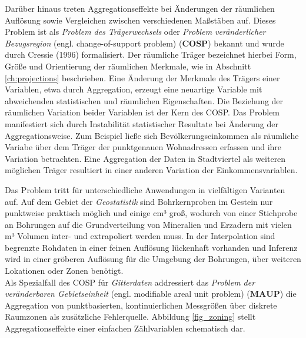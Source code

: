 Darüber hinaus treten Aggregationseffekte bei Änderungen der räumlichen Auflösung sowie Vergleichen zwischen verschiedenen Maßstäben auf.
Dieses Problem ist als \emph{Problem des Trägerwechsels} oder \emph{Problem veränderlicher Bezugsregion} (engl. change-of-support problem) ($\mathbf{COSP}$) bekannt und 
wurde durch Cressie (1996) formalisiert. Der räumliche Träger bezeichnet hierbei Form, Größe und Orientierung der räumlichen Merkmale, wie in Abschnitt \ref{ch:projections} beschrieben. 
Eine Änderung der Merkmale des Trägers einer Variablen, etwa durch Aggregation, erzeugt eine neuartige Variable mit 
abweichenden statistischen und räumlichen Eigenschaften.
Die Beziehung der räumlichen Variation beider Variablen ist der Kern des COSP. \cite[S. 107]{waller_applied_2004}
Das Problem manifestiert sich durch Instabilität statistischer Resultate bei Änderung der Aggregationsweise. 
Zum Beispiel ließe sich Bevölkerungseinkommen als räumliche Variabe über dem Träger der punktgenauen Wohnadressen erfassen und ihre Variation betrachten.
Eine Aggregation der Daten in Stadtviertel als weiteren möglichen Träger resultiert in einer anderen Variation der Einkommensvariablen.

Das Problem tritt für unterschiedliche Anwendungen in vielfältigen Varianten auf.  
Auf dem Gebiet der \emph{Geostatistik} sind Bohrkernproben im Gestein nur punktweise praktisch möglich und einige cm³ groß, 
wodurch von einer Stichprobe an Bohrungen auf die Grundverteilung von Mineralien und Erzadern mit vielen m³ Volumen inter- und extrapoliert werden muss. 
In der Interpolation sind begrenzte Rohdaten in einer feinen Auflösung lückenhaft vorhanden und Inferenz wird in einer gröberen Auflösung für die Umgebung der Bohrungen, 
über weiteren Lokationen oder Zonen benötigt.\\

Als Spezialfall des COSP für \emph{Gitterdaten} addressiert das \emph{Problem der veränderbaren Gebietseinheit} (engl. modifiable areal unit problem) ($\mathbf{MAUP}$) 
die Aggregation von punktbasierten, kontinuierlichen Messgrößen über diskrete Raumzonen als zusätzliche Fehlerquelle. 
Abbildung \ref{fig_zoning} stellt Aggregationseffekte einer einfachen Zählvariablen schematisch dar.

